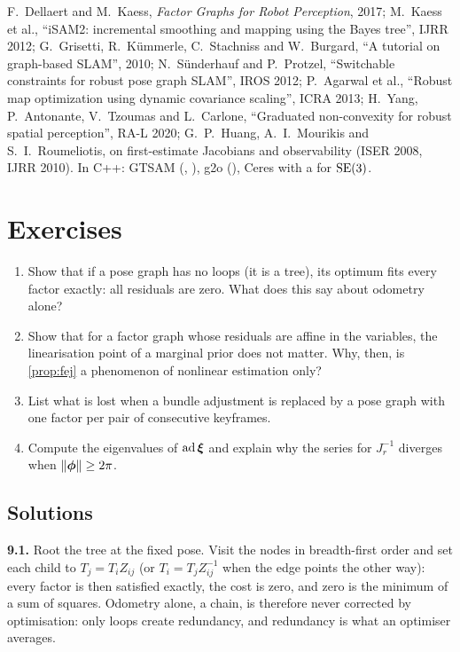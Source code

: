F.~Dellaert and M.~Kaess, \emph{Factor Graphs for Robot Perception},
2017; M.~Kaess et al., ``iSAM2: incremental smoothing and mapping using
the Bayes tree'', IJRR 2012; G.~Grisetti, R.~K\"ummerle, C.~Stachniss and
W.~Burgard, ``A tutorial on graph-based SLAM'', 2010; N.~S\"underhauf and
P.~Protzel, ``Switchable constraints for robust pose graph SLAM'', IROS
2012; P.~Agarwal et al., ``Robust map optimization using dynamic
covariance scaling'', ICRA 2013; H.~Yang, P.~Antonante, V.~Tzoumas and
L.~Carlone, ``Graduated non-convexity for robust spatial perception'',
RA-L 2020; G.~P.~Huang, A.~I.~Mourikis and S.~I.~Roumeliotis, on
first-estimate Jacobians and observability (ISER 2008, IJRR 2010). In
C++: GTSAM (, ), g2o
(), Ceres with a  for $\mathrm{SE}(3)$.

\FloatBarrier
\section*{Exercises}

\begin{enumerate}[label=\textbf{9.\arabic*},ref=9.\arabic*]
\item\label{ex:9tree} Show that if a pose graph has no loops (it is a
  tree), its optimum fits every factor exactly: all residuals are zero.
  What does this say about odometry alone?
\item\label{ex:9linear} Show that for a factor graph whose residuals are
  affine in the variables, the linearisation point of a marginal prior
  does not matter. Why, then, is \cref{prop:fej} a phenomenon of
  nonlinear estimation only?
\item\label{ex:9loss} List what is lost when a bundle adjustment is
  replaced by a pose graph with one factor per pair of consecutive
  keyframes.
\item\label{ex:9ad} Compute the eigenvalues of $\operatorname{ad}\bm{\xi}$ and explain why
  the series for $J_r^{-1}$ diverges when $\left\lVert \bm{\phi}\right\rVert\ge2\pi$.
\end{enumerate}

\subsection*{Solutions}

\textbf{9.1.} Root the tree at the fixed pose. Visit the nodes in
breadth-first order and set each child to $T_j=T_iZ_{ij}$ (or
$T_i=T_jZ_{ij}^{-1}$ when the edge points the other way): every factor
is then satisfied exactly, the cost is zero, and zero is the minimum of a
sum of squares. Odometry alone, a chain, is therefore never corrected by
optimisation: only loops create redundancy, and redundancy is what an
optimiser averages.

